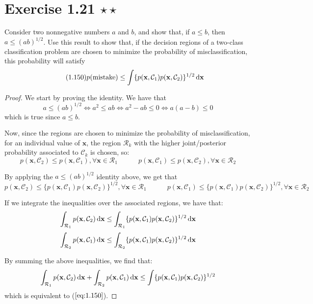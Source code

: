 \section*{Exercise 1.21 $\star \star$}
Consider two nonnegative numbers $a$ and $b$, and show that, if $a \leq b$, then
$a \leq (ab)^{1/2}$. Use this result to show that, if the decision regions of a two-class
classification problem are chosen to minimize the probability of misclassification,
this probability will satisfy
\begin{equation}\label{eq:1.150}\tag{1.150}
    p(\text{mistake}) \leq \int \{p(\mathbf{x}, \mathcal{C}_1)p(\mathbf{x}, \mathcal{C}_2)\}^{1/2} 
    \mathop{}\!\mathrm{d} \mathbf{x}
\end{equation}

\begin{proof}
    We start by proving the identity. We have that 
    \[
        a \leq (ab)^{1/2} \iff a^2 \leq ab \iff a^2 - ab \leq 0 \iff a(a - b) \leq 0
    \] 
    which is true since $a \leq b$.

    Now, since the regions are chosen to minimize the probability of misclassification,
    for an individual value of $\mathbf{x}$, the region $\mathcal{R}_k$ with the higher joint/posterior 
    probability associated to $\mathcal{C}_k$ is chosen, so:
    \[
        p(\mathbf{x}, \mathcal{C}_2) \leq p(\mathbf{x}, \mathcal{C}_1), \forall \mathbf{x} \in \mathcal{R}_1
        \hspace{3em}
        p(\mathbf{x}, \mathcal{C}_1) \leq p(\mathbf{x}, \mathcal{C}_2), \forall \mathbf{x} \in \mathcal{R}_2
    \] 

    By applying the $a \leq (ab)^{1/2}$ identity above, we get that
    \[
        p(\mathbf{x}, \mathcal{C}_2) \leq \{p(\mathbf{x}, \mathcal{C}_1) p(\mathbf{x}, \mathcal{C}_2)\}^{1/2},
        \forall \mathbf{x} \in \mathcal{R}_1
        \hspace{3em}
        p(\mathbf{x}, \mathcal{C}_1) \leq \{p(\mathbf{x}, \mathcal{C}_1) p(\mathbf{x}, \mathcal{C}_2)\}^{1/2},
        \forall \mathbf{x} \in \mathcal{R}_2
    \] 

    If we integrate the inequalities over the associated regions, we have that:
    \[
        \int_{\mathcal{R}_1} p(\mathbf{x}, \mathcal{C}_2) \mathop{}\!\mathrm{d} \mathbf{x} \leq 
        \int_{\mathcal{R}_1} \{p(\mathbf{x}, \mathcal{C}_1) p(\mathbf{x}, \mathcal{C}_2)\}^{1/2} \mathop{}\!\mathrm{d} \mathbf{x}
    \] 
    \[
        \int_{\mathcal{R}_2} p(\mathbf{x}, \mathcal{C}_1) \mathop{}\!\mathrm{d} \mathbf{x} \leq 
        \int_{\mathcal{R}_2} \{p(\mathbf{x}, \mathcal{C}_1) p(\mathbf{x}, \mathcal{C}_2)\}^{1/2} \mathop{}\!\mathrm{d} \mathbf{x}
    \]

    By summing the above inequalities, we find that:
    \[
        \int_{\mathcal{R}_1} p(\mathbf{x}, \mathcal{C}_2) \mathop{}\!\mathrm{d} \mathbf{x} + 
        \int_{\mathcal{R}_2} p(\mathbf{x}, \mathcal{C}_1) \mathop{}\!\mathrm{d} \mathbf{x} \leq
        \int \{p(\mathbf{x}, \mathcal{C}_1)p(\mathbf{x}, \mathcal{C}_2)\}^{1/2} 
    \] 
    which is equivalent to ($\ref{eq:1.150}$).
\end{proof}

